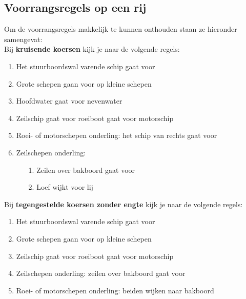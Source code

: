 \subsection{Voorrangsregels op een rij}
Om de voorrangsregels makkelijk te kunnen onthouden staan ze hieronder samengevat:\\[0.1cm]
Bij \textbf{kruisende koersen} kijk je naar de volgende regels:
\vspace*{-0.15cm}
\begin{enumerate}
    \item Het stuurboordswal varende schip gaat voor
    \item Grote schepen gaan voor op kleine schepen
    \item Hoofdwater gaat voor nevenwater
    \item Zeilschip gaat voor roeiboot gaat voor motorschip
    \item Roei- of motorschepen onderling: het schip van rechts gaat voor
    \item Zeilschepen onderling: 
        \begin{enumerate}
	            \item [1.]Zeilen over bakboord gaat voor
	            \item [2.]Loef wijkt voor lij
	        \end{enumerate}
\end{enumerate}

Bij \textbf{tegengestelde koersen zonder engte} kijk je naar de volgende regels:
\vspace*{-0.15cm}
\begin{enumerate}
    \item Het stuurboordswal varende schip gaat voor
    \item Grote schepen gaan voor op kleine schepen
    \item Zeilschip gaat voor roeiboot gaat voor motorschip
    \item Zeilschepen onderling: zeilen over bakboord gaat voor
    \item Roei- of motorschepen onderling: beiden wijken naar bakboord
\end{enumerate}

